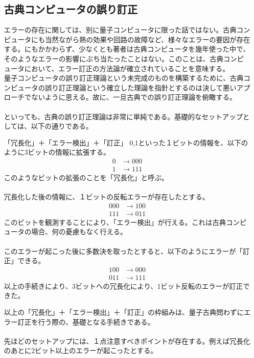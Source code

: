 \documentclass[a4paper,10.5pt]{article}
\numberwithin{equation}{section}
\begin{document}
\subsection{古典コンピュータの誤り訂正}
エラーの存在に関しては、別に量子コンピュータに限った話ではない。古典コンピュータにも当然ながら熱の効果や回路の故障など、様々なエラーの要因が存在する。にもかかわらず、少なくとも著者は古典コンピュータを幾年使った中で、そのようなエラーの影響にぶち当たったことはない。このことは、古典コンピュータにおいて、エラー訂正の方法論が確立されていることを意味する。\\
量子コンピュータの誤り訂正理論という未完成のものを構築するために、古典コンピュータの誤り訂正理論という確立した理論を指針とするのは決して悪いアプローチでないように思える。故に、一旦古典での誤り訂正理論を俯瞰する。\\
\\
といっても、古典の誤り訂正理論は非常に単純である。基礎的なセットアップとしては、以下の通りである。
\begin{setupbox}{「冗長化」＋「エラー検出」＋「訂正」}
0,1といった１ビットの情報を、以下のように3ビットの情報に拡張する。
\begin{align*}
    0 &\to 000\\
    1 &\to 111
\end{align*}
このようなビットの拡張のことを「冗長化」と呼ぶ。\\
\\
冗長化した後の情報に、１ビットの反転エラーが存在したとする。
\begin{align*}
    000&\to 100\\
    111&\to 011
\end{align*}
このビットを観測することにより、「エラー検出」が行える。これは古典コンピュータの場合、何の憂慮もなく行える。\\
\\
このエラーが起こった後に多数決を取ったとすると、以下のようにエラーが「訂正」できる。
\begin{align*}
    100&\to 000\\
    011&\to 111
\end{align*}
以上の手続きにより、3ビットへの冗長化により、1ビット反転のエラーが訂正できた。
\end{setupbox}
以上の「冗長化」＋「エラー検出」＋「訂正」の枠組みは、量子古典問わずにエラー訂正を行う際の、基礎となる手続きである。\\
\\
先ほどのセットアップには、１点注意すべきポイントが存在する。例えば冗長化のあとに2ビット以上のエラーが起こったとする。
\end{document}
